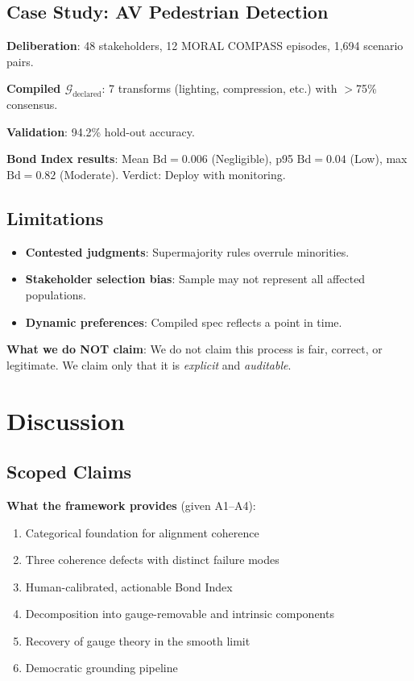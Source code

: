 \documentclass[12pt]{article}
\begin{document}
\subsection{Case Study: AV Pedestrian Detection}

\textbf{Deliberation}: 48 stakeholders, 12 MORAL COMPASS episodes, 1,694 scenario pairs.

\textbf{Compiled $\mathcal{G}_{\mathrm{declared}}$}: 7 transforms (lighting, compression, etc.) with $>$75\% consensus.

\textbf{Validation}: 94.2\% hold-out accuracy.

\textbf{Bond Index results}: Mean $\mathrm{Bd} = 0.006$ (Negligible), p95 $\mathrm{Bd} = 0.04$ (Low), max $\mathrm{Bd} = 0.82$ (Moderate). Verdict: Deploy with monitoring.

\subsection{Limitations}
\begin{itemize}
    \item \textbf{Contested judgments}: Supermajority rules overrule minorities.
    \item \textbf{Stakeholder selection bias}: Sample may not represent all affected populations.
    \item \textbf{Dynamic preferences}: Compiled spec reflects a point in time.
\end{itemize}

\textbf{What we do NOT claim}: We do not claim this process is fair, correct, or legitimate. We claim only that it is \emph{explicit} and \emph{auditable}.

\section{Discussion}

\subsection{Scoped Claims}

\textbf{What the framework provides} (given A1--A4):
\begin{enumerate}
    \item Categorical foundation for alignment coherence
    \item Three coherence defects with distinct failure modes
    \item Human-calibrated, actionable Bond Index
    \item Decomposition into gauge-removable and intrinsic components
    \item Recovery of gauge theory in the smooth limit
    \item Democratic grounding pipeline
\end{enumerate}
\end{document}
